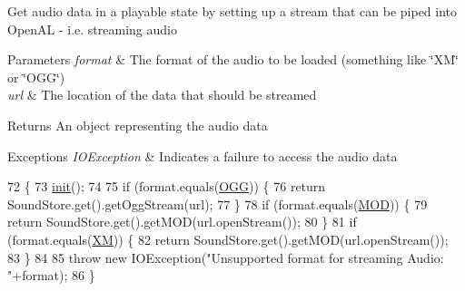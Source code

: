 Get audio data in a playable state by setting up a stream that can be piped into Open\+AL -\/ i.\+e. streaming audio


\begin{DoxyParams}{Parameters}
{\em format} & The format of the audio to be loaded (something like \char`\"{}\+X\+M\char`\"{} or \char`\"{}\+O\+G\+G\char`\"{}) \\
\hline
{\em url} & The location of the data that should be streamed \\
\hline
\end{DoxyParams}
\begin{DoxyReturn}{Returns}
An object representing the audio data 
\end{DoxyReturn}

\begin{DoxyExceptions}{Exceptions}
{\em I\+O\+Exception} & Indicates a failure to access the audio data \\
\hline
\end{DoxyExceptions}

\begin{DoxyCode}
72                                                                                      \{
73         \mbox{\hyperlink{classorg_1_1newdawn_1_1slick_1_1openal_1_1_audio_loader_ad2d2f4bb59fef206981fbe0896ecc87c}{init}}();
74         
75         \textcolor{keywordflow}{if} (format.equals(\mbox{\hyperlink{classorg_1_1newdawn_1_1slick_1_1openal_1_1_audio_loader_ad4fe9acae97947804dc4c70ef7bbff24}{OGG}})) \{
76             \textcolor{keywordflow}{return} SoundStore.get().getOggStream(url);
77         \}
78         \textcolor{keywordflow}{if} (format.equals(\mbox{\hyperlink{classorg_1_1newdawn_1_1slick_1_1openal_1_1_audio_loader_a24d845d2340fdda4197cb5654963b3d2}{MOD}})) \{
79             \textcolor{keywordflow}{return} SoundStore.get().getMOD(url.openStream());
80         \}
81         \textcolor{keywordflow}{if} (format.equals(\mbox{\hyperlink{classorg_1_1newdawn_1_1slick_1_1openal_1_1_audio_loader_adfb5103d54cb3853abc1ec6d0f4c002f}{XM}})) \{
82             \textcolor{keywordflow}{return} SoundStore.get().getMOD(url.openStream());
83         \}
84         
85         \textcolor{keywordflow}{throw} \textcolor{keyword}{new} IOException(\textcolor{stringliteral}{"Unsupported format for streaming Audio: "}+format);
86     \}
\end{DoxyCode}
\mbox{\label{classorg_1_1newdawn_1_1slick_1_1openal_1_1_audio_loader_ad2d2f4bb59fef206981fbe0896ecc87c}} 
